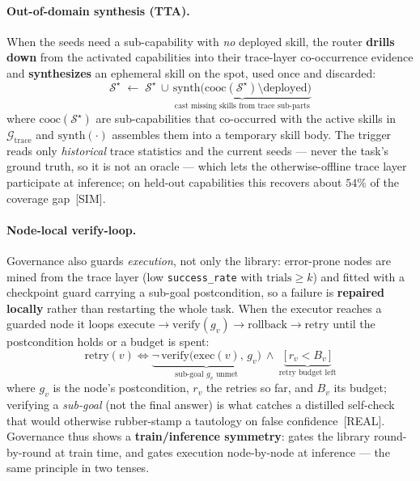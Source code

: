 \paragraph{Out-of-domain synthesis (TTA).}
When the seeds need a sub-capability with \emph{no} deployed skill, the router \textbf{drills down} from the activated capabilities into their trace-layer co-occurrence evidence and \textbf{synthesizes} an ephemeral skill on the spot, used once and discarded:
\begin{equation}
\mathcal{S}^\star \;\leftarrow\; \mathcal{S}^\star \,\cup\, \underbrace{\text{synth}\big(\text{cooc}(\mathcal{S}^\star)\setminus\text{deployed}\big)}_{\text{cast missing skills from trace sub-parts}}
\label{eq:tta}
\end{equation}
where $\text{cooc}(\mathcal{S}^\star)$ are sub-capabilities that co-occurred with the active skills in $\mathcal{G}_{\text{trace}}$ and $\text{synth}(\cdot)$ assembles them into a temporary skill body.
The trigger reads only \emph{historical} trace statistics and the current seeds --- never the task's ground truth, so it is not an oracle --- which lets the otherwise-offline trace layer participate at inference; on held-out capabilities this recovers about $54\%$ of the coverage gap~[SIM].

\paragraph{Node-local verify-loop.}
Governance also guards \emph{execution}, not only the library: error-prone nodes are mined from the trace layer (low \texttt{success\_rate} with $\text{trials}\!\geq\!k$) and fitted with a checkpoint guard carrying a sub-goal postcondition, so a failure is \textbf{repaired locally} rather than restarting the whole task.
When the executor reaches a guarded node it loops $\text{execute}\to\text{verify}(g_v)\to\text{rollback}\to\text{retry}$ until the postcondition holds or a budget is spent:
\begin{equation}
\text{retry}(v)\iff \underbrace{\neg\,\text{verify}\big(\text{exec}(v),\,g_v\big)}_{\text{sub-goal $g_v$ unmet}}\ \wedge\ \underbrace{\big[\,r_v < B_v\,\big]}_{\text{retry budget left}}
\label{eq:verify}
\end{equation}
where $g_v$ is the node's postcondition, $r_v$ the retries so far, and $B_v$ its budget; verifying a \emph{sub-goal} (not the final answer) is what catches a distilled self-check that would otherwise rubber-stamp a tautology on false confidence~[REAL].
Governance thus shows a \textbf{train/inference symmetry}:  gates the library round-by-round at train time, and  gates execution node-by-node at inference --- the same principle in two tenses.

